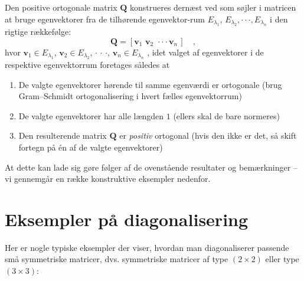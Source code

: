\begin{theorem}
Den positive ortogonale matrix $\mathbf{Q}$ konstrueres dernæst ved som søjler i matricen at bruge egenvektorer fra de tilhørende egenvektor-rum $E_{\lambda_{1}}$, $E_{\lambda_{2}}, \cdot \cdot \cdot , E_{\lambda_{n}}$ i den rigtige rækkefølge:
\begin{equation}
\mathbf{Q} = \left[\mathbf{v}_{1}\,\, \mathbf{v}_{2} \, \, \cdot \cdot \cdot  \mathbf{v}_{n}\, \right] \quad ,
\end{equation}
hvor $\mathbf{v}_{1} \in E_{\lambda_{1}}$, $\mathbf{v}_{2} \in E_{\lambda_{2}}$, $\cdot$ $\cdot$ $\cdot$, $\mathbf{v}_{n} \in E_{\lambda_{n}}\,\,$, idet valget af egenvektorer i de respektive egenvektorrum foretages således at
\begin{enumerate}
\item De valgte egenvektorer hørende til samme egenværdi er ortogonale  (brug Gram--Schmidt ortogonalisering i hvert fælles egenvektorrum)
\item De valgte egenvektorer har alle længden $1$ (ellers skal de bare normeres)
\item Den resulterende matrix $\mathbf{Q}$ er {\em{positiv}} ortogonal (hvis den ikke er det, så skift fortegn på \'{e}n af de valgte egenvektorer)
\end{enumerate}
At dette kan lade sig gøre følger af de ovenstående resultater og bemærkninger -- vi gennemgår en række konstruktive eksempler nedenfor.
\end{theorem}


\section{Eksempler på diagonalisering}

Her er nogle typiske eksempler der viser, hvordan man diagonaliserer passende små symmetriske matricer, dvs. symmetriske matricer af type $(2 \times 2)$ eller type $(3 \times 3)$:

